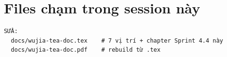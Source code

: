 \section{Files chạm trong session này}

\begin{lstlisting}[style=shell]
SỬA:
  docs/wujia-tea-doc.tex    # 7 vị trí + chapter Sprint 4.4 này
  docs/wujia-tea-doc.pdf    # rebuild từ .tex
\end{lstlisting}

